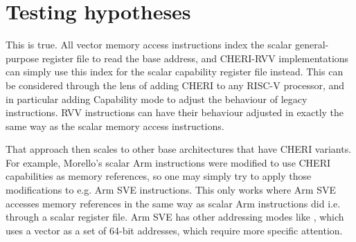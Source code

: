 \section{Testing hypotheses}

This is true.
All vector memory access instructions index the scalar general-purpose register file to read the base address, and CHERI-RVV implementations can simply use this index for the scalar capability register file instead.
This can be considered through the lens of adding CHERI to any RISC-V processor, and in particular adding Capability mode to adjust the behaviour of legacy instructions.
RVV instructions can have their behaviour adjusted in exactly the same way as the scalar memory access instructions.

That approach then scales to other base architectures that have CHERI variants.
For example, Morello's scalar Arm instructions were modified to use CHERI capabilities as memory references\cite[Section 1.3]{armltdMorelloArchitectureReference2021}, so one may simply try to apply those modifications to e.g. Arm SVE instructions.
This only works where Arm SVE accesses memory references in the same way as scalar Arm instructions did i.e. through a scalar register file.
Arm SVE has other addressing modes like , which uses a vector as a set of 64-bit addresses\cite{armltdArmCompilerScalable2019}, which require more specific attention.





